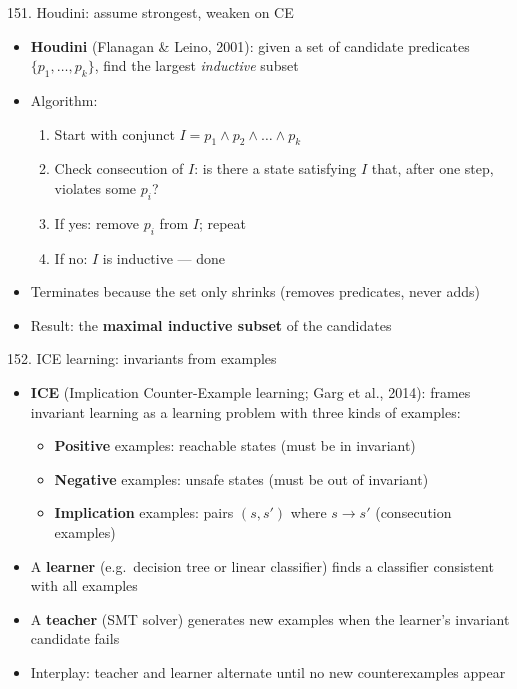 \documentclass[aspectratio=169]{beamer}
\begin{document}
\begin{frame}{151. Houdini: assume strongest, weaken on CE}
\begin{itemize}
  \item \textbf{Houdini} (Flanagan \& Leino, 2001): given a set of candidate predicates \(\{p_1, \ldots, p_k\}\), find the largest \textit{inductive} subset
  \item Algorithm:
    \begin{enumerate}
      \item Start with conjunct \(I = p_1 \wedge p_2 \wedge \ldots \wedge p_k\)
      \item Check consecution of \(I\): is there a state satisfying \(I\) that, after one step, violates some \(p_i\)?
      \item If yes: remove \(p_i\) from \(I\); repeat
      \item If no: \(I\) is inductive --- done
    \end{enumerate}
  \item Terminates because the set only shrinks (removes predicates, never adds)
  \item Result: the \textbf{maximal inductive subset} of the candidates
\end{itemize}
\end{frame}

\begin{frame}{152. ICE learning: invariants from examples}
\begin{itemize}
  \item \textbf{ICE} (Implication Counter-Example learning; Garg et al., 2014):
    frames invariant learning as a learning problem with three kinds of examples:
    \begin{itemize}
      \item \textbf{Positive} examples: reachable states (must be in invariant)
      \item \textbf{Negative} examples: unsafe states (must be out of invariant)
      \item \textbf{Implication} examples: pairs \((s, s')\) where \(s \to s'\) (consecution examples)
    \end{itemize}
  \item A \textbf{learner} (e.g.\ decision tree or linear classifier) finds a classifier consistent with all examples
  \item A \textbf{teacher} (SMT solver) generates new examples when the learner's invariant candidate fails
  \item Interplay: teacher and learner alternate until no new counterexamples appear
\end{itemize}
\end{frame}
\end{document}
